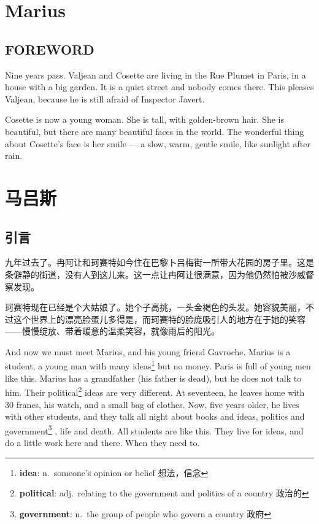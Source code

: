 \documentclass[fontset=ubuntu, zihao=5]{ctexart}
\begin{document}
\begin{paracol}{2}
\section{Marius}

\subsection*{FOREWORD}

Nine years pass. Valjean and Cosette are living in the Rue Plumet in Paris, in a house with a big garden. It is a quiet street and nobody comes there. This pleases Valjean, because he is still afraid of Inspector Javert.

Cosette is now a young woman. She is tall, with golden-brown hair. She is beautiful, but there are many beautiful faces in the world. The wonderful thing about Cosette's face is her smile --- a slow, warm, gentle smile, like sunlight after rain.

\switchcolumn

\section*{马吕斯}

\subsection*{引言}

九年过去了。冉阿让和珂赛特如今住在巴黎卜吕梅街一所带大花园的房子里。这是条僻静的街道，没有人到这儿来。这一点让冉阿让很满意，因为他仍然怕被沙威督察发现。


珂赛特现在已经是个大姑娘了。她个子高挑，一头金褐色的头发。她容貌美丽，不过这个世界上的漂亮脸蛋儿多得是，而珂赛特的脸庞吸引人的地方在于她的笑容——慢慢绽放、带着暖意的温柔笑容，就像雨后的阳光。

\switchcolumn*

And now we must meet Marius, and his young friend Gavroche. Marius is a
student, a young man with many ideas\footnote{\textbf{idea}: n. someone's
  opinion or belief 想法，信念} but no money. Paris is full of young men
like this. Marius has a grandfather (his father is dead), but he does not
talk to him. Their political\footnote{\textbf{political}: adj. relating to
  the government and politics of a country 政治的} ideas are very different.
At seventeen, he leaves home with 30 francs, his watch, and a small bag of
clothes. Now, five years older, he lives with other students, and they talk
all night about books and ideas, politics and
government\footnote{\textbf{government}: n. the group of people who govern a
  country 政府} , life and death. All students are like this. They live for
ideas, and do a little work here and there. When they need to.


\end{paracol}
\end{document}
